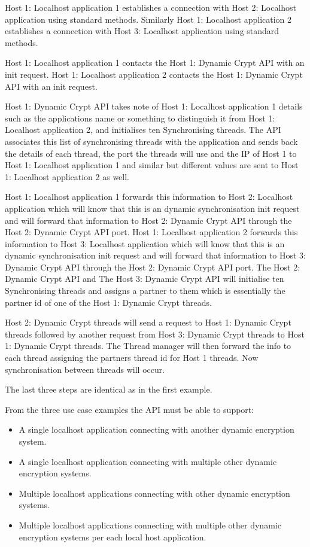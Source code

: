 Host 1: Localhost application 1 establishes a connection with Host 2: Localhost application using standard methods.
Similarly Host 1: Localhost application 2 establishes a connection with Host 3: Localhost application using standard methods.

Host 1: Localhost application 1 contacts the Host 1: Dynamic Crypt API with an init request. 
Host 1: Localhost application 2 contacts the Host 1: Dynamic Crypt API with an init request. 

Host 1: Dynamic Crypt API takes note of Host 1: Localhost application 1 details such as the applications name or something to distinguish it from Host 1: Localhost application 2, and initialises ten Synchronising threads. The API associates this list of synchronising threads with the application and sends back the details of each thread, the port the threads will use and the IP of Host 1 to Host 1: Localhost application 1 and similar but different values are sent to Host 1: Localhost application 2 as well. 

Host 1: Localhost application 1 forwards this information to Host 2: Localhost application which will know that this is an dynamic synchronisation init request and will forward that information to Host 2: Dynamic Crypt API through the Host 2: Dynamic Crypt API port. 
Host 1: Localhost application 2 forwards this information to Host 3: Localhost application which will know that this is an dynamic synchronisation init request and will forward that information to Host 3: Dynamic Crypt API through the Host 2: Dynamic Crypt API port. 
The Host 2: Dynamic Crypt API and The Host 3: Dynamic Crypt API will initialise ten Synchronising threads and assigns a partner to them which is essentially the partner id of one of the Host 1: Dynamic Crypt threads.

Host 2: Dynamic Crypt threads will send a request to Host 1: Dynamic Crypt threads followed by another request from Host 3: Dynamic Crypt threads to Host 1: Dynamic Crypt threads. The Thread manager will then forward the info to each thread assigning the partners thread id for Host 1 threads. Now synchronisation between threads will occur.

The last three steps are identical as in the first example.



From the three use case examples the API must be able to support:
\begin{itemize}
    \item A single localhost application connecting with another dynamic encryption system.
    \item A single localhost application connecting with multiple other dynamic encryption systems.
    \item Multiple localhost applications connecting with other dynamic encryption systems.
    \item Multiple localhost applications connecting with multiple other dynamic encryption systems per each local host application.
\end{itemize}

